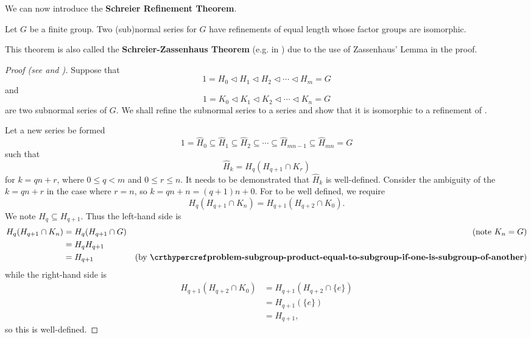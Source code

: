 We can now introduce the \textbf{Schreier Refinement Theorem}.
\begin{theorem}\label{thrm-schreier}
    Let $G$ be a finite group. Two (sub)normal series for $G$ have refinements of equal length whose factor groups are isomorphic.
\end{theorem}
\begin{remark}
    This theorem is also called the \textbf{Schreier-Zassenhaus Theorem} (e.g. in \cite{clark_1984,proofwiki_schreierzassenhaus}) due to the use of Zassenhaus' Lemma in the proof.
\end{remark}

\begin{proof}[Proof (see {\cite[\S 72]{clark_1984}} and \cite{proofwiki_schreierzassenhaus})]
    Suppose that
    \begin{equation}\label{eqn:thrm-schreier-eqn-a}
        1 = H_0 \lhd H_1 \lhd H_2 \lhd \cdots \lhd H_m = G    
        \tag{A}
    \end{equation}
    and
    \begin{equation}\label{eqn:thrm-schreier-eqn-b}
        1 = K_0 \lhd K_1 \lhd K_2 \lhd \cdots \lhd K_n = G    
        \tag{B}
    \end{equation}
    are two subnormal series of $G$. We shall refine the subnormal series  to a series  and show that it is isomorphic to a refinement  of .
    
    Let a new series be formed
    \begin{equation}\label{eqn:thrm-schreier-eqn-a-prime}
        1 = \hat{H}_0 \subseteq \hat{H}_1 \subseteq \hat{H}_2 \subseteq \cdots \subseteq \hat{H}_{mn - 1} \subseteq \hat{H}_{mn} = G
        \tag{A'}
    \end{equation}
    such that
    \[
        \hat{H}_k = H_q(H_{q+1}\cap K_r)
    \]
    for $k = qn + r$, where $0 \leq q < m$ and $0 \leq r \leq n$. It needs to be demonstrated that $\hat{H}_k$ is well-defined. Consider the ambiguity of the $k = qn + r$ in the case where $r = n$, so $k = qn + n = (q+1)n + 0$. For  to be well defined, we require
    \[
        H_q(H_{q+1} \cap K_n) = H_{q+1}(H_{q+2} \cap K_0).
    \]
    We note $H_q \subseteq H_{q+1}$. Thus the left-hand side is
    \begin{align*}
        H_q(H_{q+1} \cap K_n) &= H_q(H_{q+1} \cap G) & (\text{note } K_n = G)\\
        &= H_qH_{q+1}\\
        &= H_{q+1} & (\text{by \myref{problem-subgroup-product-equal-to-subgroup-if-one-is-subgroup-of-another}})
    \end{align*}
    while the right-hand side is
    \begin{align*}
        H_{q+1}(H_{q+2} \cap K_0) &= H_{q+1}(H_{q+2} \cap \{e\})\\
        &= H_{q+1}(\{e\})\\
        &= H_{q+1},
    \end{align*}
    so this is well-defined.
    

\end{proof}
